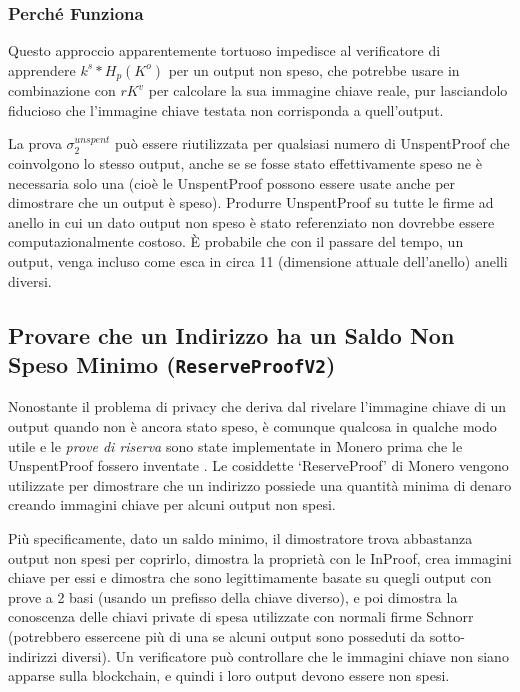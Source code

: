 \subsubsection*{Perché Funziona}

Questo approccio apparentemente tortuoso impedisce al verificatore di apprendere $k^s*H_p(K^o)$ per un output non speso, che potrebbe usare in combinazione con $r K^v$ per calcolare la sua immagine chiave reale, pur lasciandolo fiducioso che l'immagine chiave testata non corrisponda a quell'output.

La prova $\sigma^{unspent}_2$ può essere riutilizzata per qualsiasi numero di UnspentProof che coinvolgono lo stesso output, anche se se fosse stato effettivamente speso ne è necessaria solo una (cioè le UnspentProof possono essere usate anche per dimostrare che un output è speso). Produrre UnspentProof su tutte le firme ad anello in cui un dato output non speso è stato referenziato non dovrebbe essere computazionalmente costoso. È probabile che con il passare del tempo, un output, venga incluso come esca in circa 11 (dimensione attuale dell'anello) anelli diversi.


\subsection{Provare che un Indirizzo ha un Saldo Non Speso Minimo ({\tt ReserveProofV2})}
\label{subsec:proofs-minimum-balance-reserveproof}

Nonostante il problema di privacy che deriva dal rivelare l'immagine chiave di un output quando non è ancora stato speso, è comunque qualcosa in qualche modo utile e le \emph{prove di riserva} sono state implementate in Monero \cite{ReserveProof-pull-request-3027} prima che le UnspentProof fossero inventate \cite{unspent-proof-issue-68}. Le cosiddette `ReserveProof' di Monero vengono utilizzate per dimostrare che un indirizzo possiede una quantità minima di denaro creando immagini chiave per alcuni output non spesi.

Più specificamente, dato un saldo minimo, il dimostratore trova abbastanza output non spesi per coprirlo, dimostra la proprietà con le InProof, crea immagini chiave per essi e dimostra che sono legittimamente basate su quegli output con prove a 2 basi (usando un prefisso della chiave diverso), e poi dimostra la conoscenza delle chiavi private di spesa utilizzate con normali firme Schnorr (potrebbero essercene più di una se alcuni output sono posseduti da sotto-indirizzi diversi). Un verificatore può controllare che le immagini chiave non siano apparse sulla blockchain, e quindi i loro output devono essere non spesi.

